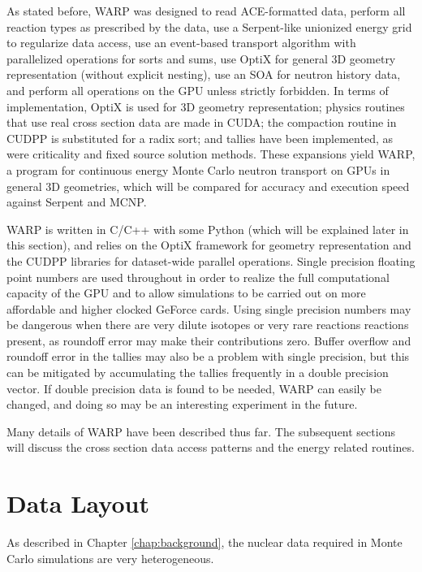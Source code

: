 As stated before, WARP was designed to read ACE-formatted data, perform all reaction types as prescribed by the data, use a Serpent-like unionized energy grid to regularize data access, use an event-based transport algorithm with parallelized operations for sorts and sums, use OptiX for general 3D geometry representation (without explicit nesting), use an SOA for neutron history data, and perform all operations on the GPU unless strictly forbidden.  In terms of implementation, OptiX is used for 3D geometry representation; physics routines that use real cross section data are made in CUDA; the compaction routine in CUDPP is substituted for a radix sort; and tallies have been implemented, as were criticality and fixed source solution methods.  These expansions yield WARP, a program for continuous energy Monte Carlo neutron transport on GPUs in general 3D geometries, which will be compared for accuracy and execution speed against Serpent and MCNP.

WARP is written in C/C++ with some Python (which will be explained later in this section), and relies on the OptiX framework for geometry representation and the CUDPP libraries for dataset-wide parallel operations. Single precision floating point numbers are used throughout in order to realize the full computational capacity of the GPU and to allow simulations to be carried out on more affordable and higher clocked GeForce cards.  Using single precision numbers may be dangerous when there are very dilute isotopes or very rare reactions reactions present, as roundoff error may make their contributions zero. %
 Buffer overflow and roundoff error in the tallies may also be a problem with single precision, but this can be mitigated by accumulating the tallies frequently in a double precision vector.  If double precision data is found to be needed, WARP can easily be changed, and doing so may be an interesting experiment in the future.

Many details of WARP have been described thus far. The subsequent sections will discuss the cross section data access patterns and the energy related routines.


\section{Data Layout}

As described in Chapter \ref{chap:background}, the nuclear data required in Monte Carlo simulations are very heterogeneous.

